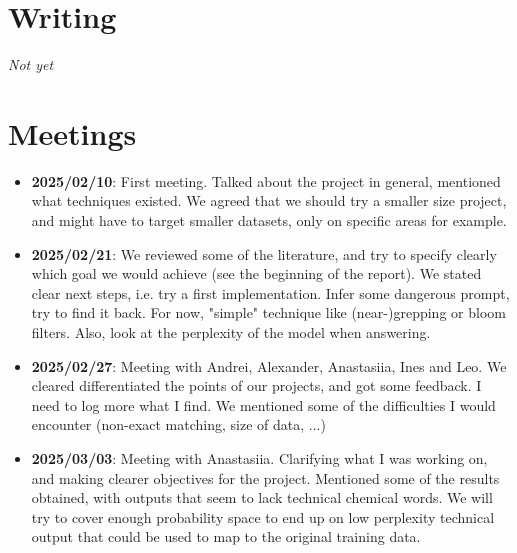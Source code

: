 \documentclass[a4paper,12pt]{article}
\begin{document}
\section*{Writing }
\textit{Not yet}

\section*{Meetings}
\begin{itemize}
    \item \textbf{2025/02/10}: First meeting. Talked about the project in general, mentioned what techniques existed. We agreed that we should try a smaller size project, and might have to target smaller datasets, only on specific areas for example.  
    \item \textbf{2025/02/21}: We reviewed some of the literature, and try to specify clearly which goal we would achieve (see the beginning of the report). We stated clear next steps, i.e. try a first implementation. Infer some dangerous prompt, try to find it back. For now, "simple" technique like (near-)grepping or bloom filters. Also, look at the perplexity of the model when answering.  
    \item \textbf{2025/02/27}: Meeting with Andrei, Alexander, Anastasiia, Ines and Leo. We cleared differentiated the points of our projects, and got some feedback. I need to log more what I find. We mentioned some of the difficulties I would encounter (non-exact matching, size of data, ...)
    \item \textbf{2025/03/03}: Meeting with Anastasiia. Clarifying what I was working on, and making clearer objectives for the project. Mentioned some of the results obtained, with outputs that seem to lack technical chemical words. We will try to cover enough probability space to end up on low perplexity technical output that could be used to map to the original training data.
    
\end{itemize}

\printbibliography
\end{document}
